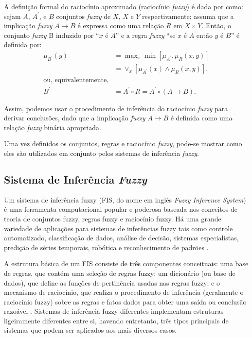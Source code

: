 A definição formal do raciocínio aproximado (raciocínio \textit{fuzzy}) é dada por  como: sejam $A$, $A^\prime$, e $B$ conjuntos \textit{fuzzy} de $X$, $X$ e $Y$ respectivamente; assuma que a implicação \textit{fuzzy} $A \rightarrow B$ é expressa como uma relação $R$ em $X \times Y$. Então, o conjunto \textit{fuzzy} B induzido por ``$x$ é $A$'' e a regra \textit{fuzzy} ``se $x$ é $A$ então $y$ é $B$'' é definida por:
\begin{align*}
\mu_{B^\prime}(y) &= \max\nolimits_x \min[\mu_{A^\prime}, \mu_R(x,y)]
\\
&= \vee_x[\mu_{A^\prime}(x) \wedge \mu_R(x,y)], \\
\mbox{ou, equivalentemente,} \\
B^\prime &= A^\prime \circ R = A^\prime \circ (A \rightarrow B).
\end{align*}
 
Assim, podemos usar o procedimento de inferência do raciocínio \textit{fuzzy} para derivar conclusões, dado que a implicação \textit{fuzzy} $A \rightarrow B$ é definida como uma relação \textit{fuzzy} binária apropriada.

Uma vez definidos os conjuntos, regras e raciocínio \textit{fuzzy}, pode-se mostrar como eles são utilizados em conjunto pelos sistemas de inferência \textit{fuzzy}.
 
\subsection{Sistema de Inferência \textit{Fuzzy}}
\label{sec:sistema_inferencai_fuzzy}

Um sistema de inferência fuzzy (FIS, do nome em inglês \textit{Fuzzy Inference System}) é uma ferramenta computacional popular e poderosa baseada nos conceitos de teoria de conjuntos fuzzy, regras fuzzy e raciocínio fuzzy. Há uma grande variedade de aplicações para sistemas de inferências fuzzy tais como controle automatizado, classificação de dados, análise de decisão, sistemas especialistas, predição de séries temporais, robótica e reconhecimento de padrões \cite[p.~73]{Jang1997}.

A estrutura básica de um FIS consiste de três componentes conceituais: uma base de regras, que contém uma seleção de regras fuzzy; um dicionário (ou base de dados), que define as funções de pertinência usadas nas regras fuzzy; e o mecanismo de raciocínio, que realiza o procedimento de inferência (geralmente o raciocínio fuzzy) sobre as regras e fatos dados para obter uma saída ou conclusão razoável \cite[p.~73]{Jang1997}. Sistemas de inferência fuzzy diferentes implementam estruturas ligeiramente diferentes entre si, havendo entretanto, três tipos principais de sistemas que podem ser aplicados aos mais diversos casos.

